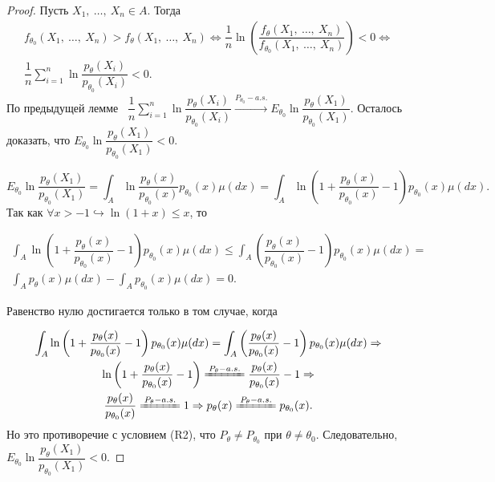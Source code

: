 \begin{proof}
    Пусть $\displaystyle X_{1} ,\ \dotsc ,\ X_{n} \in A$. Тогда
    \begin{gather*}
        f_{\theta _{0}}( X_{1} ,\ \dotsc ,\ X_{n})  >f_{\theta }( X_{1} ,\ \dotsc ,\ X_{n}) \Leftrightarrow \dfrac{1}{n}\ln\left(\dfrac{f_{\theta }( X_{1} ,\ \dotsc ,\ X_{n})}{f_{\theta _{0}}( X_{1} ,\ \dotsc ,\ X_{n})}\right) < 0\Leftrightarrow \\
        \dfrac{1}{n}\sum _{i=1}^{n}\ln\dfrac{p_{\theta }( X_{i})}{p_{\theta _{0}}( X_{i})} < 0.
    \end{gather*}
    По предыдущей лемме \ $\displaystyle \dfrac{1}{n}\sum _{i=1}^{n}\ln\dfrac{p_{\theta }( X_{i})}{p_{\theta _{0}}( X_{i})}\xrightarrow{P_{\theta_0 } -a.s.} E_{\theta _{0}}\ln\dfrac{p_{\theta }( X_{1})}{p_{\theta _{0}}( X_{1})}$. Осталось доказать, что $\displaystyle E_{\theta _{0}}\ln\dfrac{p_{\theta }( X_{1})}{p_{\theta _{0}}( X_{1})} < 0$.
    
    
    \begin{equation*}
        E_{\theta _{0}}\ln\dfrac{p_{\theta }( X_{1})}{p_{\theta _{0}}( X_{1})} =\int _{A}\ln\dfrac{p_{\theta }( x)}{p_{\theta _{0}}( x)} p_{\theta _{0}}( x) \mu ( dx) =\int _{A}\ln\left( 1+\dfrac{p_{\theta }( x)}{p_{\theta _{0}}( x)} -1\right) p_{\theta _{0}}( x) \mu ( dx) .
    \end{equation*}
    Так как $\displaystyle \forall x >-1\hookrightarrow \ln( 1+x) \leqslant x$, то
    
    
    \begin{gather*}
        \int _{A}\ln\left( 1+\dfrac{p_{\theta }( x)}{p_{\theta _{0}}( x)} -1\right) p_{\theta _{0}}( x) \mu ( dx) \leqslant \int _{A}\left(\dfrac{p_{\theta }( x)}{p_{\theta _{0}}( x)} -1\right) p_{\theta _{0}}( x) \mu ( dx) =\\
        \int _{A} p_{\theta }( x) \mu ( dx) -\int _{A} p_{\theta _{0}}( x) \mu ( dx) =0.
    \end{gather*}
    
    
    Равенство нулю достигается только в том случае, когда 
    
    
    \begin{gather*}
        \int _{A}\ln\left( 1+\dfrac{p_{\theta }( x)}{p_{\theta _{0}}( x)} -1\right) p_{\theta _{0}}( x) \mu ( dx) =\int _{A}\left(\dfrac{p_{\theta }( x)}{p_{\theta _{0}}( x)} -1\right) p_{\theta _{0}}( x) \mu ( dx) \Rightarrow \\
        \ln\left( 1+\dfrac{p_{\theta }( x)}{p_{\theta _{0}}( x)} -1\right)\xlongequal{P_{\theta } -a.s.}\dfrac{p_{\theta }( x)}{p_{\theta _{0}}( x)} -1\Rightarrow \\
        \dfrac{p_{\theta }( x)}{p_{\theta _{0}}( x)}\xlongequal{P_{\theta } -a.s.} 1\Rightarrow p_{\theta }( x)\xlongequal{P_{\theta } -a.s.} p_{\theta _{0}}( x) .
    \end{gather*}
    Но это противоречие с условием (R2), что $\displaystyle P_{\theta } \neq P_{\theta _{0}}$ при $\displaystyle \theta \neq \theta _{0}$. Следовательно, $\displaystyle E_{\theta _{0}}\ln\dfrac{p_{\theta }( X_{1})}{p_{\theta _{0}}( X_{1})} < 0$.
\end{proof}

